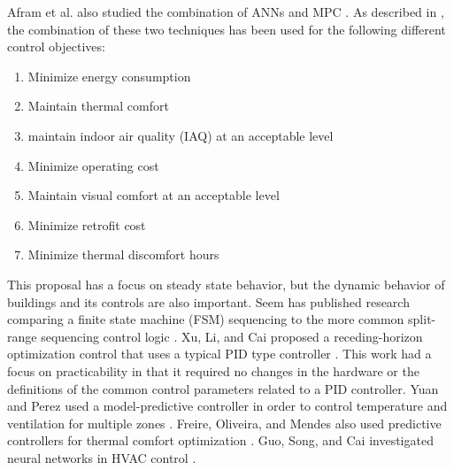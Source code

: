 Afram et al. also studied the combination of ANNs and MPC
\cite{Afram2017}. As described in \cite{Afram2017}, the combination of
these two techniques has been used for the following different control
objectives:

\begin{enumerate}
    \item Minimize energy consumption \cite{Ferreira2012, Huang2015a, Kusiak2011OptimizationOfAnHVACSystemWithAStrength, Kusiak2014MinimizationOfEnergyConsumptionInHVAC,WeiXiupeng2015, Garnier2015, Kim2016, LuLu2005HVACSystemOptimization, Ning2010Neuro-optimalSystem}
    \item Maintain thermal comfort \cite{Ferreira2012, Kusiak2011OptimizationOfAnHVACSystemWithAStrength, Kusiak2014MinimizationOfEnergyConsumptionInHVAC, WeiXiupeng2015, Garnier2015, Kim2016}
    \item maintain indoor air quality (IAQ) at an acceptable level \cite{Kusiak2011MultiObjective}
    \item Minimize operating cost \cite{Garnier2015, Lee2015, Huang2015a, Ruano2015, Ruano2016}
    \item Maintain visual comfort at an acceptable level \cite{Kim2016}
    \item Minimize retrofit cost \cite{Asadi2014a}
    \item Minimize thermal discomfort hours \cite{Asadi2014a}
\end{enumerate}

This proposal has a focus on steady state behavior, but the dynamic
behavior of buildings and its controls are also important. Seem has
published research comparing a finite state machine (FSM) sequencing to
the more common split-range sequencing control logic \cite{Seem1999}.
Xu, Li, and Cai proposed a receding-horizon optimization control that
uses a typical PID type controller \cite{XuMin2005}. This work had a
focus on practicability in that it required no changes in the hardware
or  the definitions of the common control parameters related to a PID
controller. Yuan and Perez used a model-predictive controller in order
to control temperature and ventilation for multiple zones
\cite{Yuan2006Multiple-zoneStrategy}. Freire, Oliveira, and Mendes also
used predictive controllers for thermal comfort optimization
\cite{Freire2008PredictiveSavings}.  Guo, Song, and Cai investigated
neural networks in HVAC control \cite{Guo2007}.
